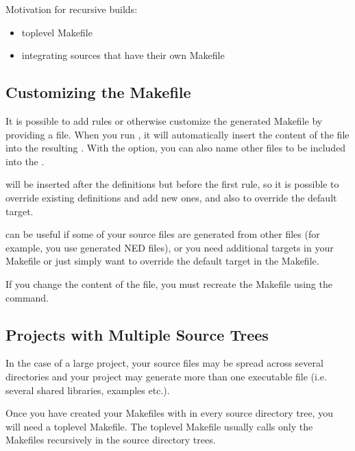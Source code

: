 Motivation for recursive builds:
\begin{itemize}
 \item toplevel Makefile
 \item integrating sources that have their own Makefile
\end{itemize}


\subsection{Customizing the Makefile}
\label{sec:makefrag}

It is possible to add rules or otherwise customize the generated Makefile
by providing a  file. When you run , it
will automatically insert the content of the  file into the
resulting . With the  option, you can also name other
files to be included into the .

 will be inserted after the definitions but before the first
rule, so it is possible to override existing definitions and add new
ones, and also to override the default target.

 can be useful if some of your source files are generated
from other files (for example, you use generated NED files), or you need
additional targets in your Makefile or just simply want to override the
default target in the Makefile.

\begin{note}
If you change the content of the  file, you must recreate the
Makefile using the  command.
\end{note}

\subsection{Projects with Multiple Source Trees}
\label{sec:build-sim-progs:projects-with-multiple-source-trees}

In the case of a large project, your source files may be spread across
several directories and your project may generate more than one executable
file (i.e. several shared libraries, examples etc.).

Once you have created your Makefiles with  in
every source directory tree, you will need a toplevel Makefile.
The toplevel Makefile usually calls only the Makefiles
recursively in the source directory trees.


